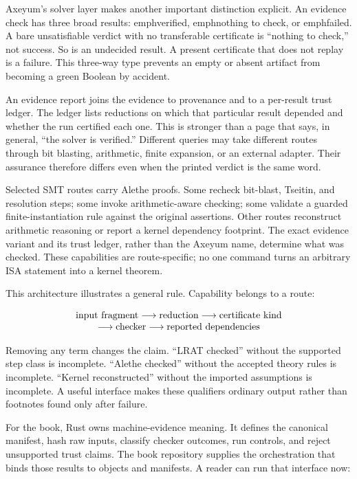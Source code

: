 Axeyum's solver layer makes another important distinction explicit. An
evidence check has three broad results: emph{verified}, emph{nothing to
check}, or emph{failed}. A bare unsatisfiable verdict with no transferable
certificate is ``nothing to check,'' not success. So is an undecided result.
A present certificate that does not replay is a failure. This three-way type
prevents an empty or absent artifact from becoming a green Boolean by
accident.

An evidence report joins the evidence to provenance and to a per-result trust
ledger. The ledger lists reductions on which that particular result depended
and whether the run certified each one. This is stronger than a page that
says, in general, ``the solver is verified.'' Different queries may take
different routes through bit blasting, arithmetic, finite expansion, or an
external adapter. Their assurance therefore differs even when the printed
verdict is the same word.

Selected SMT routes carry Alethe proofs. Some recheck bit-blast, Tseitin, and
resolution steps; some invoke arithmetic-aware checking; some validate a
guarded finite-instantiation rule against the original assertions. Other
routes reconstruct arithmetic reasoning or report a kernel dependency
footprint. The exact evidence variant and its trust ledger, rather than the
Axeyum name, determine what was checked. These capabilities are route-specific;
no one command turns an arbitrary ISA statement into a kernel theorem.

This architecture illustrates a general rule. Capability belongs to a route:

\[
  \begin{array}{c}
  \hbox{input fragment} \longrightarrow \hbox{reduction}
    \longrightarrow \hbox{certificate kind} \\
  \longrightarrow \hbox{checker}
    \longrightarrow \hbox{reported dependencies}
  \end{array}
\]

Removing any term changes the claim. ``LRAT checked'' without the supported
step class is incomplete. ``Alethe checked'' without the accepted theory rules
is incomplete. ``Kernel reconstructed'' without the imported assumptions is
incomplete. A useful interface makes these qualifiers ordinary output rather
than footnotes found only after failure.

For the book, Rust owns machine-evidence meaning. It defines the canonical
manifest, hash raw inputs, classify checker outcomes, run controls, and reject
unsupported trust claims. The book repository supplies the orchestration that
binds those results to objects and manifests. A reader can run that interface
now:


